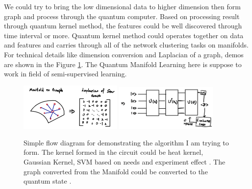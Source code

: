 \documentclass{article}
\begin{document}
% 


We could try to bring the low dimensional data to higher dimension 
then form graph and process through the quantum computer. 
Based on processing 
result through quantum kernel method, the features could be well 
discovered through time interval or more.
 Quantum kernel method could operates together 
on data and features 
and carries through all of the network clustering tasks on 
manifolds. For technical details like dimension conversion and Laplacian 
of a graph, demos are shown in the Figure \ref*{ppp}. The Quantum Manifold 
Learning here is suppose to work in field of semi-supervised learning. 

\begin{figure}[h]
  \begin{center}
    \includegraphics[width=0.45\textwidth]{manifold0.png}
    \includegraphics[width=0.45\textwidth]{qkernel.png}
  \end{center}
  \caption{
  Simple flow diagram for demonstrating the algorithm I am 
  trying to form. The kernel formed in the circuit could 
  be heat kernel, Gaussian Kernel, SVM based on needs 
  and experiment effect
  \cite{manifold2}. The 
  graph converted from the Manifold could 
  be converted to the quantum state \cite{encoding1}. }
  \label{ppp}
\end{figure}
\end{document}
